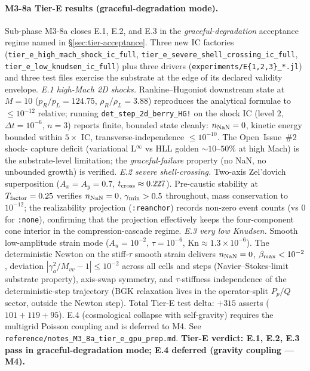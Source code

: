 \documentclass[11pt]{article}
\begin{document}
\paragraph{M3-8a Tier-E results (graceful-degradation mode).}
Sub-phase M3-8a closes E.1, E.2, and E.3 in the
\emph{graceful-degradation} acceptance regime named in
\S\ref{sec:tier-acceptance}. Three new IC factories
(\texttt{tier\_e\_high\_mach\_shock\_ic\_full},
\texttt{tier\_e\_severe\_shell\_crossing\_ic\_full},
\texttt{tier\_e\_low\_knudsen\_ic\_full}) plus three drivers
(\texttt{experiments/E\{1,2,3\}\_*.jl}) and three test files exercise
the substrate at the edge of its declared validity envelope.
\emph{E.1 high-Mach 2D shocks.} Rankine--Hugoniot downstream state at
$M=10$ ($p_R/p_L = 124.75$, $\rho_R/\rho_L = 3.88$) reproduces the
analytical formulae to $\le 10^{-12}$ relative; running
\texttt{det\_step\_2d\_berry\_HG!} on the shock IC (level $2$,
$\Delta t = 10^{-6}$, $n=3$) reports finite, bounded state cleanly:
$n_{\rm NaN} = 0$, kinetic energy bounded within $5\times$ IC,
transverse-independence $\le 10^{-10}$. The Open~Issue~\#2 shock-
capture deficit (variational L$^\infty$ vs HLL golden $\sim 10\text{--
}50\%$ at high Mach) is the substrate-level limitation; the
\emph{graceful-failure} property (no NaN, no unbounded growth) is
verified.
\emph{E.2 severe shell-crossing.} Two-axis Zel'dovich superposition
($A_x = A_y = 0.7$, $t_{\rm cross} \approx 0.227$). Pre-caustic
stability at $T_{\rm factor} = 0.25$ verifies $n_{\rm NaN} = 0$,
$\gamma_{\rm min} > 0.5$ throughout, mass conservation to $10^{-12}$;
the realizability projection (\texttt{:reanchor}) records non-zero
event counts (vs $0$ for \texttt{:none}), confirming that the
projection effectively keeps the four-component cone interior in the
compression-cascade regime.
\emph{E.3 very low Knudsen.} Smooth low-amplitude strain mode
($A_u = 10^{-2}$, $\tau = 10^{-6}$, $\mathrm{Kn} \approx 1.3\times
10^{-6}$). The deterministic Newton on the stiff-$\tau$ smooth strain
delivers $n_{\rm NaN} = 0$, $\beta_{\rm max} < 10^{-2}$, deviation
$|\gamma_a^2/M_{vv} - 1| \le 10^{-2}$ across all cells and steps
(Navier--Stokes-limit substrate property), axis-swap symmetry, and
$\tau$-stiffness independence of the deterministic-step trajectory
(BGK relaxation lives in the operator-split $P_p/Q$ sector, outside
the Newton step). Total Tier-E test delta:
$+315$ asserts ($101 + 119 + 95$). E.4 (cosmological collapse with
self-gravity) requires the multigrid Poisson coupling and is deferred
to M4. See \verb|reference/notes_M3_8a_tier_e_gpu_prep.md|.
\textbf{Tier-E verdict: E.1, E.2, E.3 pass in graceful-degradation
mode; E.4 deferred (gravity coupling --- M4).}
\end{document}
